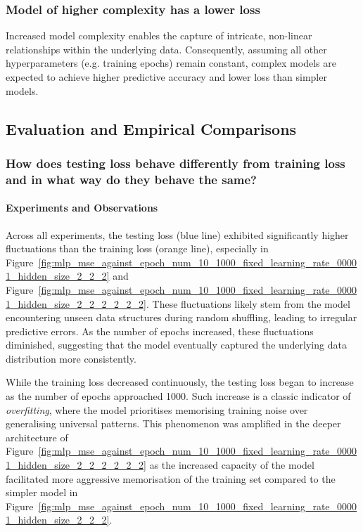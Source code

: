 \documentclass{article}
\begin{document}
\subsubsection{Model of higher complexity has a lower loss}
Increased model complexity enables the capture of intricate, non-linear relationships within the underlying data. Consequently, assuming all other hyperparameters (e.g. training epochs) remain constant, complex models are expected to achieve higher predictive accuracy and lower loss than simpler models. 


\subsection{Evaluation and Empirical Comparisons}


\subsubsection{How does testing loss behave differently from training loss and in what way do they behave the same? }
\paragraph{Experiments and Observations}
Across all experiments, the testing loss (blue line) exhibited significantly higher fluctuations than the training loss (orange line), especially in Figure~\ref{fig:mlp_mse_against_epoch_num_10_1000_fixed_learning_rate_00001_hidden_size_2_2_2} and Figure~\ref{fig:mlp_mse_against_epoch_num_10_1000_fixed_learning_rate_00001_hidden_size_2_2_2_2_2_2}. These fluctuations likely stem from the model encountering unseen data structures during random shuffling, leading to irregular predictive errors. As the number of epochs increased, these fluctuations diminished, suggesting that the model eventually captured the underlying data distribution more consistently. 

While the training loss decreased continuously, the testing loss began to increase as the number of epochs approached 1000. Such increase is a classic indicator of \textit{overfitting}, where the model prioritises memorising training noise over generalising universal patterns. This phenomenon was amplified in the deeper architecture of Figure~\ref{fig:mlp_mse_against_epoch_num_10_1000_fixed_learning_rate_00001_hidden_size_2_2_2_2_2_2} as the increased capacity of the model facilitated more aggressive memorisation of the training set compared to the simpler model in Figure~\ref{fig:mlp_mse_against_epoch_num_10_1000_fixed_learning_rate_00001_hidden_size_2_2_2}. 
\end{document}
